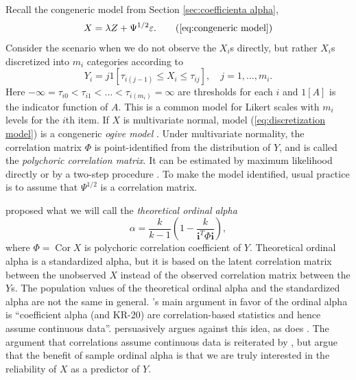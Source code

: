 \documentclass[twoside]{article}
\DeclareMathOperator{\Cor}{Cor}
\begin{document}
Recall the congeneric model from Section \ref{sec:coefficienta alpha},
\begin{equation}
X=\lambda Z+\Psi^{1/2}\varepsilon.    \tag{\ref{eq:congeneric model}}
\end{equation}
Consider the scenario when we do not observe the $X_{i}$s directly,
but rather $X_{i}$s discretized into $m_{i}$ categories according
to
\begin{equation}
Y_{i}=j1[\tau_{i(j-1)}\leq X_{i}\leq\tau_{ij}],\quad j = 1, \ldots,m_i. \label{eq:discretization model}
\end{equation}
Here $-\infty=\tau_{i0}<\tau_{i1}<\ldots<\tau_{i(m_{i})}=\infty$
are thresholds for each $i$ and $1[A]$ is the indicator function of $A$.
This is a common model for Likert scales with $m_{i}$ levels for
the $i$th item. If $X$ is multivariate normal, model (\ref{eq:discretization model})
is a congeneric \textit{ogive model} \citep{Swaminathan2016-rg}.
Under multivariate normality, the correlation matrix $\Phi$ is point-identified
from the distribution of $Y$, and is called the \textit{polychoric
correlation matrix}. It can be estimated by maximum likelihood directly
or by a two-step procedure \citep{Olsson1979-ti}. To make the model
identified, usual practice is to assume that $\Psi^{1/2}$ is a correlation
matrix. 

\citet{Zumbo2007-ap} proposed what we will call the \textit{theoretical ordinal
alpha}
\begin{equation}
\alpha=\frac{k}{k-1}\left(1-\frac{k}{\mathbf{i}^{T}\Phi\mathbf{i}}\right), \label{eq:ordinal alpha}
\end{equation}
where $\Phi=\Cor X$ is polychoric correlation coefficient of $Y$.
Theoretical ordinal alpha is a standardized alpha, but it is based
on the latent correlation matrix between the unobserved $X$ instead
of the observed correlation matrix between the $Y$s. The population
values of the theoretical ordinal alpha and the standardized alpha
are not the same in general. \citet[p. 27]{Zumbo2007-ap}'s main argument
in favor of the ordinal alpha is \enquote{coefficient alpha (and KR-20)
are correlation-based statistics and hence assume continuous data}. \citet[p. 1060]{Chalmers2018-fj}
persuasively argues against this idea, as does \citet{Raykov2019-yr}. The argument that correlations assume continuous data is reiterated
by \citet{Gadermann2012-jl}, but \citet{Zumbo2019-lm} argue
that the benefit of sample ordinal alpha is that we are truly interested
in the reliability of $X$ as a predictor of $Y$.
\end{document}

